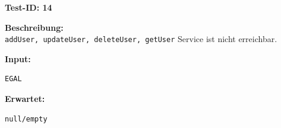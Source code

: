 \textbf{Test-ID: 14}

\textbf{Beschreibung:} \\
\texttt{addUser, updateUser, deleteUser, getUser} Service ist nicht erreichbar.

\textbf{Input:}
\begin{lstlisting}[language=XML, caption={getUser-Anfrage mit fehlerhaften Daten Input}]
  EGAL
\end{lstlisting}

\textbf{Erwartet:}
\begin{lstlisting}[language=XML, caption={getUser-Anfrage mit fehlerhaften Daten Output}]
  null/empty
\end{lstlisting}